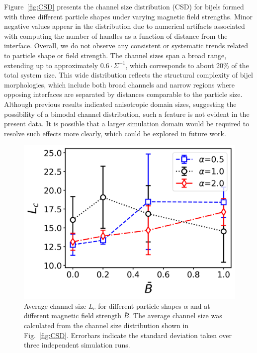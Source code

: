 Figure~\ref{fig:CSD} presents the channel size distribution (CSD) for bijels formed with three different particle shapes under varying magnetic field strengths. Minor negative values appear in 
the distribution due to numerical artifacts associated with computing the number of handles as a function of distance from the interface. Overall, we do not observe any consistent or systematic 
trends related to particle shape or field strength. The channel sizes span a broad range, extending up to approximately \(0.6 \cdot \Sigma^{-1}\), which corresponds to about 20\% of the total system 
size. This wide distribution reflects the structural complexity of bijel morphologies, which include both broad channels and narrow regions where opposing interfaces are separated by distances 
comparable to the particle size. Although previous results indicated anisotropic domain sizes, suggesting the possibility of a bimodal channel distribution, such a feature is not evident in the 
present data. It is possible that a larger simulation domain would be required to resolve such effects more clearly, which could be explored in future work.

\begin{figure}
\centering
\includegraphics[width=.5\textwidth]{../figures/results/paper1_5/channel_size_field.png}%
\caption{Average channel size $L_c$ for different particle shapes $\alpha$ and at different magnetic field strength $\bar{B}$. The average channel size was calculated from the channel size distribution shown in Fig.~\ref{fig:CSD}. Errorbars indicate the standard deviation taken over three independent simulation runs.
\label{fig:channel_size_field}}%
\end{figure}

